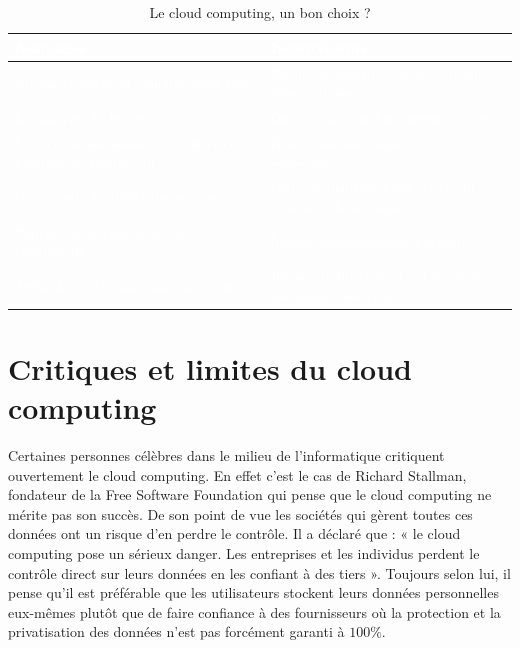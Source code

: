 \documentclass[a4 paper, 12 pt]{article}
\begin{document}
\begin{table}[h] 
\begin{tabular} {|p{7cm}||p{7cm}|} \hline
	\textcolor{white}{\textbf{Avantages}} & \textcolor{white}{\textbf{Inconvénients}} \\ \hline
 \textcolor{white}{Un fonctionnement simplifié pour tous.} &\textcolor{white}{Risque de sécurité avec des attaques informatiques.}\\ \hline
 
 \textcolor{white}{La maîtrise du budget.} & \textcolor{white}{On dépend d’un fournisseur d’accès.}\\ \hline

\textcolor{white}{La sécurité des données garanties en fonction du fournisseur.} &\textcolor{white}{ Bande passante importante nécessaire.}\\ \hline

\textcolor{white}{Une grande flexibilité des services.} &\textcolor{white}{ Perte de maîtrise d’une partie du système informatique.} \\ \hline

\textcolor{white}{Support idéal pour le travail collaboratif.} & \textcolor{white}{Impact environnemental négatif.} \\ \hline 

\textcolor{white}{Technologie de pointe mis en œuvre.} & \textcolor{white}{Risque d’utilisation des données par des organismes tiers.} \\ \hline



\end{tabular}
\caption{ Le cloud computing, un bon choix ? \cite{chaoui2016entreprise}}
\label{3}
\end{table}


\section{Critiques et limites du cloud computing }

Certaines personnes célèbres dans le milieu de l’informatique critiquent ouvertement le cloud computing. En effet c’est le cas de Richard Stallman, fondateur de la Free Software Foundation qui pense que le cloud computing ne mérite pas son succès. De son point de vue les sociétés qui gèrent toutes ces données ont un risque d’en perdre le contrôle. Il a déclaré que : « le cloud computing pose un sérieux danger. Les entreprises et les individus perdent le contrôle direct sur leurs données en les confiant à des tiers ». \cite{CCTH} Toujours selon lui, il pense qu’il est préférable que les utilisateurs stockent leurs données personnelles eux-mêmes plutôt que de faire confiance à des fournisseurs où la protection et la privatisation des données n’est pas forcément garanti à $100\%$.\newline 
\end{document}
